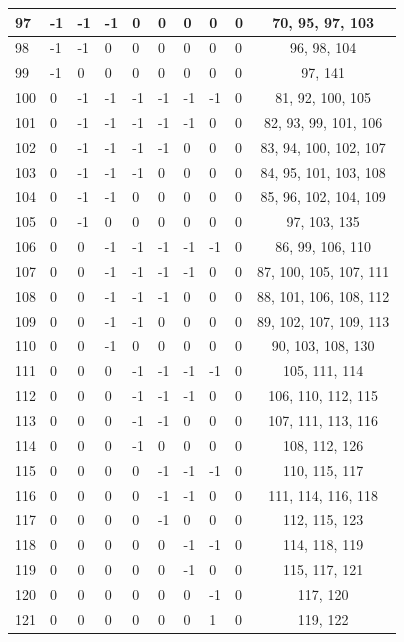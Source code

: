\begin{longtable}{|l|l|l|l|l|l|l|l|l|c|}
97 & -1 & -1 & -1 & 0 & 0 & 0 & 0 & 0 & 70, 95, 97, 103 \\ \hline
98 & -1 & -1 & 0 & 0 & 0 & 0 & 0 & 0 & 96, 98, 104 \\ \hline
99 & -1 & 0 & 0 & 0 & 0 & 0 & 0 & 0 & 97, 141 \\ \hline
100 & 0 & -1 & -1 & -1 & -1 & -1 & -1 & 0 & 81, 92, 100, 105 \\ \hline
101 & 0 & -1 & -1 & -1 & -1 & -1 & 0 & 0 & 82, 93, 99, 101, 106 \\ \hline
102 & 0 & -1 & -1 & -1 & -1 & 0 & 0 & 0 & 83, 94, 100, 102, 107 \\ \hline
103 & 0 & -1 & -1 & -1 & 0 & 0 & 0 & 0 & 84, 95, 101, 103, 108 \\ \hline
104 & 0 & -1 & -1 & 0 & 0 & 0 & 0 & 0 & 85, 96, 102, 104, 109 \\ \hline
105 & 0 & -1 & 0 & 0 & 0 & 0 & 0 & 0 & 97, 103, 135 \\ \hline
106 & 0 & 0 & -1 & -1 & -1 & -1 & -1 & 0 & 86, 99, 106, 110 \\ \hline
107 & 0 & 0 & -1 & -1 & -1 & -1 & 0 & 0 & 87, 100, 105, 107, 111 \\ \hline
108 & 0 & 0 & -1 & -1 & -1 & 0 & 0 & 0 & 88, 101, 106, 108, 112 \\ \hline
109 & 0 & 0 & -1 & -1 & 0 & 0 & 0 & 0 & 89, 102, 107, 109, 113 \\ \hline
110 & 0 & 0 & -1 & 0 & 0 & 0 & 0 & 0 & 90, 103, 108, 130 \\ \hline
111 & 0 & 0 & 0 & -1 & -1 & -1 & -1 & 0 & 105, 111, 114 \\ \hline
112 & 0 & 0 & 0 & -1 & -1 & -1 & 0 & 0 & 106, 110, 112, 115 \\ \hline
113 & 0 & 0 & 0 & -1 & -1 & 0 & 0 & 0 & 107, 111, 113, 116 \\ \hline
114 & 0 & 0 & 0 & -1 & 0 & 0 & 0 & 0 & 108, 112, 126 \\ \hline
115 & 0 & 0 & 0 & 0 & -1 & -1 & -1 & 0 & 110, 115, 117 \\ \hline
116 & 0 & 0 & 0 & 0 & -1 & -1 & 0 & 0 & 111, 114, 116, 118 \\ \hline
117 & 0 & 0 & 0 & 0 & -1 & 0 & 0 & 0 & 112, 115, 123 \\ \hline
118 & 0 & 0 & 0 & 0 & 0 & -1 & -1 & 0 & 114, 118, 119 \\ \hline
119 & 0 & 0 & 0 & 0 & 0 & -1 & 0 & 0 & 115, 117, 121 \\ \hline
120 & 0 & 0 & 0 & 0 & 0 & 0 & -1 & 0 & 117, 120 \\ \hline
121 & 0 & 0 & 0 & 0 & 0 & 0 & 1 & 0 & 119, 122 \\ \hline

\end{longtable}
